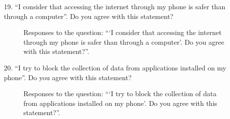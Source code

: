\vspace{2cm}

19. ``I consider that accessing the internet through my phone is safer than through a computer''. Do you agree with this statement?

\begin{figure}[H]
    \begin{center}
        \caption*{Responses to the question: ```I consider that accessing the internet through my phone is safer than through a computer'. Do you agree with this statement?''.}
        \label{fig:survey_s1_q19}
    \end{center}
\end{figure}

\clearpage

20. ``I try to block the collection of data from applications installed on my phone''. Do you agree with this statement?

\begin{figure}[H]
    \begin{center}
        \caption*{Responses to the question: ```I try to block the collection of data from applications installed on my phone'. Do you agree with this statement?''.}
        \label{fig:survey_s1_q20}
    \end{center}
\end{figure}

